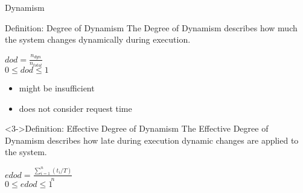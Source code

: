\begin{frame}{Dynamism}
  \begin{block}{Definition: Degree of Dynamism}
    The \alert{Degree of Dynamism} describes how much the system changes dynamically during execution.

    \begin{center}
      $dod = \frac{n_{dyn}}{n_{total}}$\\
      $0 \le dod \le 1$
    \end{center}

  \end{block}

  \begin{itemize}
    \item<2-> might be insufficient
    \item<2-> does not consider request time
  \end{itemize}

  \begin{block}<3->{Definition: Effective Degree of Dynamism}
    The \alert{Effective Degree of Dynamism} describes how late during execution dynamic changes are applied to the system.

    \begin{center}
      $edod = \frac{\sum_{i=1}^n(t_i/T) }{n}$\\
      $0 \le edod \le 1$
    \end{center}

  \end{block}

\end{frame} 
